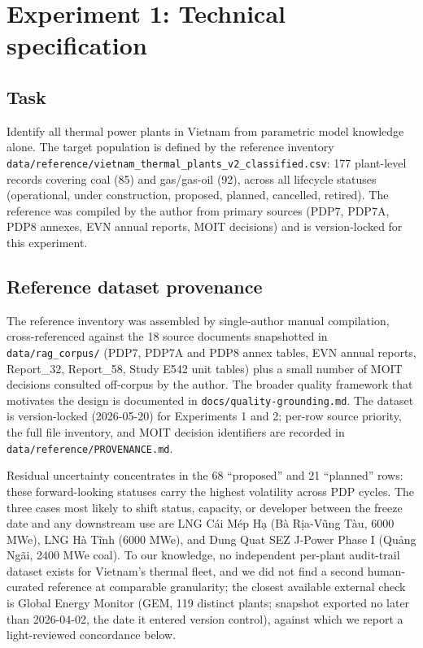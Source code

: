 \documentclass[a4paper,11pt]{article}
\begin{document}
\section{Experiment 1: Technical specification}\label{sec:annex-exp1}

\subsection*{Task}

Identify all thermal power plants in Vietnam from parametric model
knowledge alone. The target population is defined by the reference
inventory
\texttt{data/reference/vietnam\_thermal\_plants\_v2\_classified.csv}:
177 plant-level records covering coal (85) and gas/gas-oil (92), across
all lifecycle statuses (operational, under construction, proposed,
planned, cancelled, retired). The reference was compiled by the author
from primary sources (PDP7, PDP7A, PDP8 annexes, EVN annual reports,
MOIT decisions) and is version-locked for this experiment.

\subsection*{Reference dataset
provenance}

The reference inventory was assembled by single-author manual
compilation, cross-referenced against the 18 source documents
snapshotted in \texttt{data/rag\_corpus/} (PDP7, PDP7A and PDP8 annex
tables, EVN annual reports, Report\_32, Report\_58, Study E542 unit
tables) plus a small number of MOIT decisions consulted off-corpus by
the author. The broader quality framework that motivates the design is
documented in \texttt{docs/quality-grounding.md}. The dataset is
version-locked (2026-05-20) for Experiments 1 and 2; per-row source
priority, the full file inventory, and MOIT decision identifiers are
recorded in \texttt{data/reference/PROVENANCE.md}.

Residual uncertainty concentrates in the 68 ``proposed'' and 21
``planned'' rows: these forward-looking statuses carry the highest
volatility across PDP cycles. The three cases most likely to shift
status, capacity, or developer between the freeze date and any
downstream use are LNG Cái Mép Hạ (Bà Rịa-Vũng Tàu, 6000 MWe), LNG Hà
Tĩnh (6000 MWe), and Dung Quat SEZ J-Power Phase I (Quảng Ngãi, 2400 MWe
coal). To our knowledge, no independent per-plant audit-trail dataset
exists for Vietnam's thermal fleet, and we did not find a second
human-curated reference at comparable granularity; the closest available
external check is Global Energy Monitor (GEM, 119 distinct plants;
snapshot exported no later than 2026-04-02, the date it entered version
control), against which we report a light-reviewed concordance below.
\end{document}

